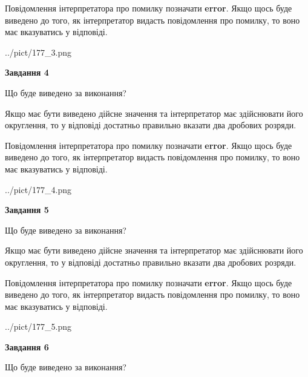 \documentclass[12pt, ukrainian]{article}
\begin{document}
{\begin {Large}
Повідомлення інтерпретатора про помилку позначати \textbf{error}.
Якщо щось буде виведено до того, як інтерпретатор видасть повідомлення про помилку, 
то воно має вказуватись у відповіді. \par

\begin{center}
	{../pict/177_3.png}
\end{center}
\newpage

{\begin {center}\textbf{Завдання 4}\end {center}}\par
Що буде виведено за виконання? \par

Якщо має бути виведено дійсне значення та інтерпретатор має здійснювати його округлення, 
то у відповіді достатньо правильно вказати два дробових розряди.

Повідомлення інтерпретатора про помилку позначати \textbf{error}.
Якщо щось буде виведено до того, як інтерпретатор видасть повідомлення про помилку, 
то воно має вказуватись у відповіді. \par

\begin{center}
	{../pict/177_4.png}
\end{center}
\newpage

{\begin {center}\textbf{Завдання 5}\end {center}}\par
Що буде виведено за виконання? \par

Якщо має бути виведено дійсне значення та інтерпретатор має здійснювати його округлення, 
то у відповіді достатньо правильно вказати два дробових розряди.

Повідомлення інтерпретатора про помилку позначати \textbf{error}.
Якщо щось буде виведено до того, як інтерпретатор видасть повідомлення про помилку, 
то воно має вказуватись у відповіді. \par

\begin{center}
	{../pict/177_5.png}
\end{center}
\newpage

{\begin {center}\textbf{Завдання 6}\end {center}}\par
Що буде виведено за виконання? \par


\end{Large}}
\end{document}
